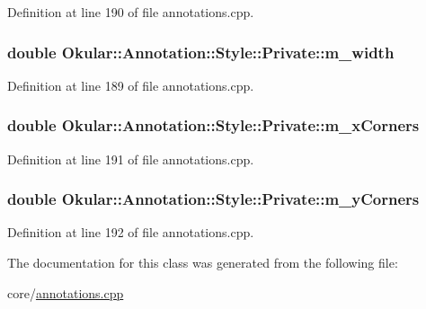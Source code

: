 Definition at line 190 of file annotations.\+cpp.

\hypertarget{classAnnotation_1_1Style_1_1Private_a0cae4e3136dd86eba05cec2c278b5ba8}{
\subsubsection[{m\+\_\+width}]{\setlength{\rightskip}{0pt plus 5cm}double Okular\+::\+Annotation\+::\+Style\+::\+Private\+::m\+\_\+width}}\label{classAnnotation_1_1Style_1_1Private_a0cae4e3136dd86eba05cec2c278b5ba8}


Definition at line 189 of file annotations.\+cpp.

\hypertarget{classAnnotation_1_1Style_1_1Private_a49fd6ed3b60ba42106bff4274eadca6f}{
\subsubsection[{m\+\_\+x\+Corners}]{\setlength{\rightskip}{0pt plus 5cm}double Okular\+::\+Annotation\+::\+Style\+::\+Private\+::m\+\_\+x\+Corners}}\label{classAnnotation_1_1Style_1_1Private_a49fd6ed3b60ba42106bff4274eadca6f}


Definition at line 191 of file annotations.\+cpp.

\hypertarget{classAnnotation_1_1Style_1_1Private_ac90f79f3f0714b3fb9bd7439f9cc5275}{
\subsubsection[{m\+\_\+y\+Corners}]{\setlength{\rightskip}{0pt plus 5cm}double Okular\+::\+Annotation\+::\+Style\+::\+Private\+::m\+\_\+y\+Corners}}\label{classAnnotation_1_1Style_1_1Private_ac90f79f3f0714b3fb9bd7439f9cc5275}


Definition at line 192 of file annotations.\+cpp.



The documentation for this class was generated from the following file\+:\begin{DoxyCompactItemize}
\item 
core/\hyperlink{annotations_8cpp}{annotations.\+cpp}\end{DoxyCompactItemize}
